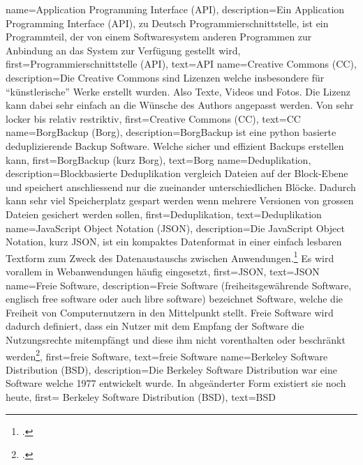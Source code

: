 {
    name={Application Programming Interface (API)},
    description={Ein Application Programming Interface (API), zu Deutsch
      Programmierschnittstelle, ist ein Programmteil, der von einem
      Softwaresystem anderen Programmen zur Anbindung an das System zur
      Verfügung gestellt wird},
    first={Programmierschnittstelle (API)},
    text={API}
}
{
    name={Creative Commons (CC)},
    description={Die Creative Commons sind Lizenzen welche insbesondere für
      ``künstlerische'' Werke erstellt wurden. Also Texte, Videos und Fotos.
      Die Lizenz kann dabei sehr einfach an die Wünsche des Authors angepasst
      werden. Von sehr locker bis relativ restriktiv},
    first={Creative Commons (CC)},
    text={CC}
}
{
    name={BorgBackup (Borg)},
    description={BorgBackup ist eine python basierte deduplizierende Backup
      Software. Welche sicher und effizient Backups erstellen kann},
    first={BorgBackup (kurz Borg)},
    text={Borg}
}
{
    name={Deduplikation},
    description={Blockbasierte Deduplikation vergleich Dateien auf der
      Block-Ebene und speichert anschliessend nur die zueinander
      unterschiedlichen Blöcke. Dadurch kann sehr viel Speicherplatz gespart
      werden wenn mehrere Versionen von grossen Dateien gesichert werden
      sollen},
    first={Deduplikation},
    text={Deduplikation}
}
{
    name={JavaScript Object Notation (JSON)},
    description={Die JavaScript Object Notation, kurz JSON, ist ein
      kompaktes Datenformat in einer einfach lesbaren Textform zum Zweck des
      Datenaustauschs zwischen Anwendungen.\footcite{json} Es wird vorallem in
      Webanwendungen häufig eingesetzt},
    first={JSON},
    text={JSON}
}
{
    name={Freie Software},
    description={Freie Software (freiheitsgewährende Software, englisch free
      software oder auch libre software) bezeichnet Software, welche die
      Freiheit von Computernutzern in den Mittelpunkt stellt. Freie Software
      wird dadurch definiert, dass ein Nutzer mit dem Empfang der
      Software die Nutzungsrechte mitempfängt und diese ihm nicht vorenthalten
      oder beschränkt werden\footcite{libre}},
    first={freie Software},
    text={freie Software}
}
{
    name={Berkeley Software Distribution (BSD)},
    description={Die Berkeley Software Distribution war eine Software welche
      1977 entwickelt wurde. In abgeänderter Form existiert sie noch heute},
    first={ Berkeley Software Distribution (BSD)},
    text={BSD}
}
